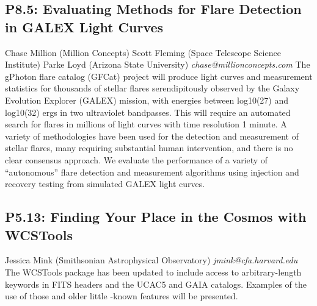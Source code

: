 \documentclass{report}
\begin{document}
\subsection*{P8.5: Evaluating Methods for Flare Detection in GALEX Light Curves}
\bigskip
Chase Million (Million Concepts) \newline Scott Fleming (Space Telescope Science Institute) \newline  Parke Loyd (Arizona State University)\newline   \newline  \newline  \newline\newline
{\it chase@millionconcepts.com}\newline
\newline\newline
The gPhoton flare catalog (GFCat) project will produce light curves and measurement statistics for thousands of stellar flares serendipitously observed by the Galaxy Evolution Explorer (GALEX) mission, with energies between log10(27) and log10(32) ergs in two ultraviolet bandpasses. This will require an automated search for flares in millions of light curves with time resolution 1 minute. A variety of methodologies have been used for the detection and measurement of stellar flares, many requiring substantial human intervention, and there is no clear consensus approach. We evaluate the performance of a variety of “autonomous” flare detection and measurement algorithms using injection and recovery testing from simulated GALEX light curves.\newline
\newpage
\subsection*{P5.13: Finding Your Place in the Cosmos with WCSTools}
\bigskip
Jessica Mink (Smithsonian Astrophysical Observatory) \newline   \newline   \newline   \newline  \newline  \newline\newline
{\it jmink@cfa.harvard.edu}\newline
\newline\newline
The WCSTools package has been updated to include access to arbitrary-length keywords in FITS headers and the UCAC5 and GAIA catalogs. Examples of the use of those and older little -known features will be presented.\newline
\newpage
\end{document}
